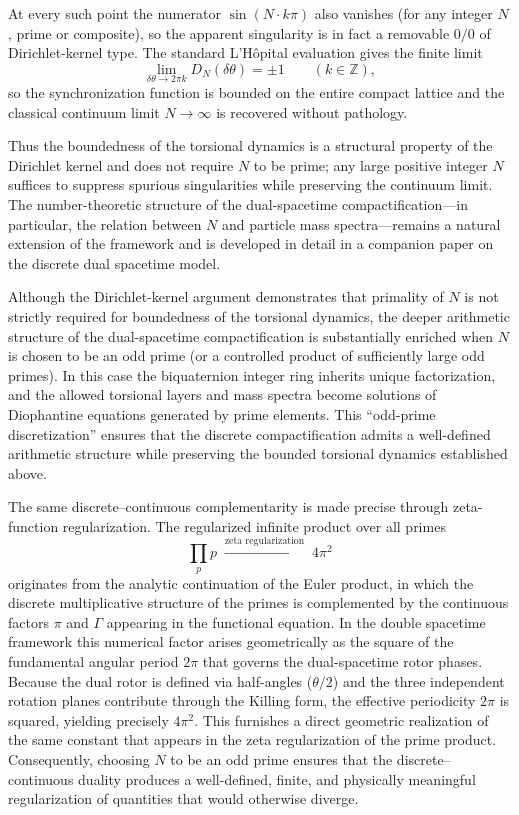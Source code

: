 \documentclass[dvipdfmx,a4paper]{article}
\begin{document}
At every such point the numerator $\sin(N \cdot k\pi)$ also vanishes (for any integer $N$, prime or composite), so the apparent singularity is in fact a removable $0/0$ of Dirichlet-kernel type. The standard L'H\^{o}pital evaluation gives the finite limit
\[
\lim_{\delta\theta \to 2\pi k} D_N(\delta\theta) = \pm 1 \qquad (k \in \mathbb{Z}),
\]
so the synchronization function is bounded on the entire compact lattice and the classical continuum limit $N \to \infty$ is recovered without pathology.

Thus the boundedness of the torsional dynamics is a structural property of the Dirichlet kernel and does not require $N$ to be prime; any large positive integer $N$ suffices to suppress spurious singularities while preserving the continuum limit. The number-theoretic structure of the dual-spacetime compactification---in particular, the relation between $N$ and particle mass spectra---remains a natural extension of the framework and is developed in detail in a companion paper on the discrete dual spacetime model.

Although the Dirichlet-kernel argument demonstrates that primality of \(N\) is not strictly required for boundedness of the torsional dynamics, the deeper arithmetic structure of the dual-spacetime compactification is substantially enriched when \(N\) is chosen to be an odd prime (or a controlled product of sufficiently large odd primes). In this case the biquaternion integer ring inherits unique factorization, and the allowed torsional layers and mass spectra become solutions of Diophantine equations generated by prime elements. This ``odd-prime discretization'' ensures that the discrete compactification admits a well-defined arithmetic structure while preserving the bounded torsional dynamics established above.

The same discrete--continuous complementarity is made precise through zeta-function regularization. The regularized infinite product over all primes
\[
\prod_p p \;\overset{\text{zeta regularization}}{\longrightarrow}\; 4\pi^2
\]
originates from the analytic continuation of the Euler product, in which the discrete multiplicative structure of the primes is complemented by the continuous factors \(\pi\) and \(\Gamma\) appearing in the functional equation. In the double spacetime framework this numerical factor arises geometrically as the square of the fundamental angular period \(2\pi\) that governs the dual-spacetime rotor phases. Because the dual rotor is defined via half-angles (\(\theta/2\)) and the three independent rotation planes contribute through the Killing form, the effective periodicity \(2\pi\) is squared, yielding precisely \(4\pi^2\). This furnishes a direct geometric realization of the same constant that appears in the zeta regularization of the prime product. Consequently, choosing \(N\) to be an odd prime ensures that the discrete--continuous duality produces a well-defined, finite, and physically meaningful regularization of quantities that would otherwise diverge.
\end{document}
